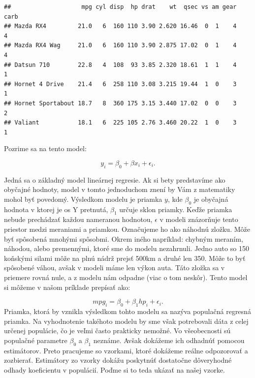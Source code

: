 \begin{verbatim}
##                    mpg cyl disp  hp drat    wt  qsec vs am gear carb
## Mazda RX4         21.0   6  160 110 3.90 2.620 16.46  0  1    4    4
## Mazda RX4 Wag     21.0   6  160 110 3.90 2.875 17.02  0  1    4    4
## Datsun 710        22.8   4  108  93 3.85 2.320 18.61  1  1    4    1
## Hornet 4 Drive    21.4   6  258 110 3.08 3.215 19.44  1  0    3    1
## Hornet Sportabout 18.7   8  360 175 3.15 3.440 17.02  0  0    3    2
## Valiant           18.1   6  225 105 2.76 3.460 20.22  1  0    3    1
\end{verbatim}

\begin{Shaded}
\begin{Highlighting}[]
\end{Highlighting}
\end{Shaded}

Pozrime sa na tento model:

\[y_i = \beta_0 + \beta{x_i} + \epsilon_i.\]

Jedná sa o základný model lineárnej regresie. Ak si bety predstavíme ako
obyčajné hodnoty, model v tomto jednoduchom znení by Vám z matematiky
mohol byť povedomý. Výsledkom modelu je priamka \(y\), kde \(\beta_0\)
je obyčajná hodnota v ktorej je os Y pretnutá, \(\beta_1\) určuje sklon
priamky. Keďže priamka nebude prechádzať každou nameranou hodnotou,
\(\epsilon\) v modeli znázorňuje tento priestor medzi meraniami a
priamkou. Označujeme ho ako náhodnú zložku. Môže byť spôsobená mnohými
spôsobmi. Okrem iného napríklad: chybným meraním, náhodou, alebo
premennými, ktoré sme do modelu nezahrnuli. Jedno auto so 150 koňskými
silami môže na plnú nádrž prejsť 500km a druhé len 350. Môže to byť
spôsobené váhou, avšak v modeli máme len výkon auta. Táto zložka sa v
priemere rovná nule, a z modelu nám odpadne (viac o tom neskôr). Tento
model si môžeme v našom príklade prepísať ako:

\[mpg_i = \beta_0 + \beta_1{hp_i} + \epsilon_i.\] Priamka, ktorá by
vznikla výsledkom tohto modelu sa nazýva populačná regresná priamka. Na
vyhodnotenie takéhoto modelu by sme však potrebovali dáta z celej
určenej populácie, čo je veľmi často prakticky nemožné. Vo všeobecnosti
sú populačné parametre \(\beta_0\) a \(\beta_1\) neznáme. Avšak dokážeme
ich odhadnúť pomocou estimátorov. Preto pracujeme so vzorkami, ktoré
dokážeme reálne odpozorovať a zozbierať. Estimátory zo vzorky dokážu
poskytnúť dostatočne dôveryhodné odhady koeficientu v populácií. Poďme
si to teda ukázať na našej vzorke.

